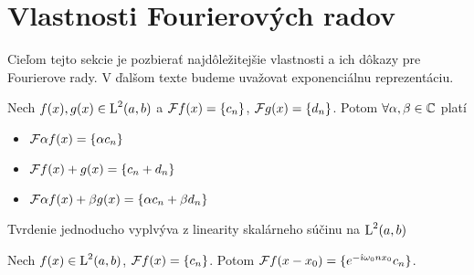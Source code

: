 \section{Vlastnosti Fourierových radov}
Cieľom tejto sekcie je pozbierať najdôležitejšie vlastnosti a ich
dôkazy pre Fourierove rady. V ďalšom texte budeme uvažovat
exponenciálnu \todo{} reprezentáciu.

\begin{veta}[Linearita]
Nech $f(x), g(x) \in \mbox{L}^2(a,b)$ a $\mathcal{F}{f(x)} = \{c_n\}$,
$\mathcal{F}{g(x)} = \{d_n\}$.
Potom $\forall \alpha,\beta \in \mathbb{C}$ platí
\begin{itemize}
    \item $\mathcal{F}{\alpha f(x)} = \{\alpha c_n\}$
    \item $\mathcal{F}{f(x) + g(x)} = \{c_n + d_n\}$
    \item $\mathcal{F}{\alpha f(x) + \beta g(x)} = \{\alpha c_n + \beta
    d_n\}$
\end{itemize}
\end{veta}
\begin{dokaz}
 Tvrdenie jednoducho vyplvýva z linearity skalárneho súčinu na $\mbox{L}^2(a,b)$
\end{dokaz}

\begin{veta}[Posúvanie]
Nech $f(x) \in \mbox{L}^2(a,b)$, $\mathcal{F}{f(x)} = \{c_n\}$. Potom
$\mathcal{F}{f(x-x_0)} = \{ e^{-\hat{\imath} \omega_0 n x_0} c_n \}$.
\end{veta}
\begin{dokaz}

\end{dokaz}
